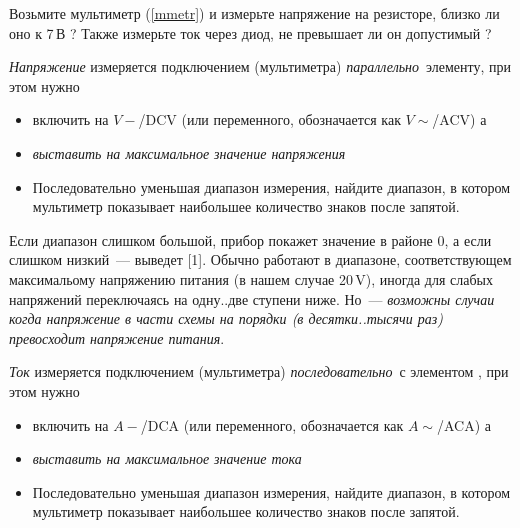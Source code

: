 Возьмите мультиметр (\ref{mmetr}) и измерьте напряжение на резисторе, близко ли
оно к 7\,В ? Также измерьте ток через диод, не превышает ли он допустимый ?

\begin{framed}
\emph{Напряжение} измеряется  подключением
 (мультиметра) \emph{параллельно}\ элементу, при этом нужно
\begin{itemize}
\item
{} включить на
 $V-$/DCV (или переменного,
обозначается как $V\sim$/ACV) а
  \item {} \emph{выставить на максимальное значение напряжения}
\item
Последовательно уменьшая диапазон измерения, найдите диапазон, в котором
мультиметр показывает наибольшее количество знаков после запятой.
\end{itemize}
\end{framed}

Если диапазон
слишком большой, прибор покажет значение в районе 0, а если слишком низкий\ ---
выведет [1]. Обычно работают в диапазоне, соответствующем максимальому
напряжению питания (в нашем случае 20\,V), иногда для
слабых напряжений переключаясь на одну..две ступени ниже. Но\ ---
\emph{возможны случаи когда напряжение в части схемы на порядки (в десятки..тысячи
раз) превосходит напряжение питания}.

\begin{framed}
\emph{Ток} измеряется  подключением  (мультиметра) \emph{последовательно}\ с элементом , при этом
нужно
\begin{itemize}
\item
{} включить на
 $A-$/DCA (или переменного, обозначается
как $A\sim$/ACA) а
  \item {} \emph{выставить на максимальное значение тока}
\item
Последовательно уменьшая диапазон измерения, найдите диапазон, в котором
мультиметр показывает наибольшее количество знаков после запятой.
\end{itemize}
\end{framed}

